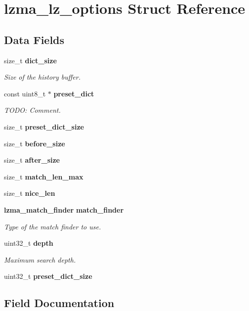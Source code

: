\section{lzma\+\_\+lz\+\_\+options Struct Reference}
\label{structlzma__lz__options}
\subsection*{Data Fields}
\begin{DoxyCompactItemize}
\item 
size\+\_\+t \textbf{ dict\+\_\+size}
\begin{DoxyCompactList}\small\item\em Size of the history buffer. \end{DoxyCompactList}\item 
const uint8\+\_\+t $\ast$ \textbf{ preset\+\_\+dict}
\begin{DoxyCompactList}\small\item\em T\+O\+DO\+: Comment. \end{DoxyCompactList}\item 
\mbox{\label{structlzma__lz__options_a0f3f942900114d44fcc720dd27492953}} 
size\+\_\+t {\bfseries preset\+\_\+dict\+\_\+size}
\item 
size\+\_\+t \textbf{ before\+\_\+size}
\item 
size\+\_\+t \textbf{ after\+\_\+size}
\item 
size\+\_\+t \textbf{ match\+\_\+len\+\_\+max}
\item 
size\+\_\+t \textbf{ nice\+\_\+len}
\item 
\textbf{ lzma\+\_\+match\+\_\+finder} \textbf{ match\+\_\+finder}
\begin{DoxyCompactList}\small\item\em Type of the match finder to use. \end{DoxyCompactList}\item 
uint32\+\_\+t \textbf{ depth}
\begin{DoxyCompactList}\small\item\em Maximum search depth. \end{DoxyCompactList}\item 
\mbox{\label{structlzma__lz__options_adc40b285d46c70ce858d753b074c5b1f}} 
uint32\+\_\+t {\bfseries preset\+\_\+dict\+\_\+size}
\end{DoxyCompactItemize}


\subsection{Field Documentation}
\mbox{\label{structlzma__lz__options_a72267f1a6f21d8b51c999b7a1ddc9ab4}} 
